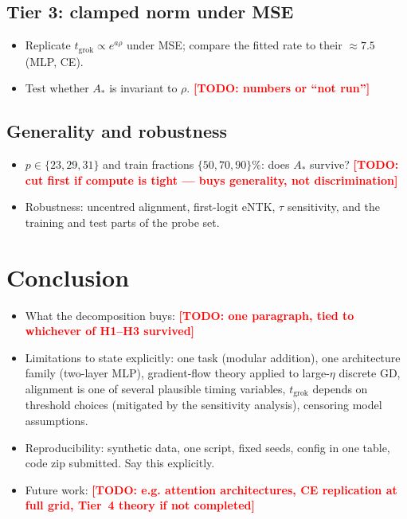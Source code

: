 \documentclass[a4paper,11pt]{article} %
\newcommand{\TODO}[1]{\textcolor{red}{\textbf{[TODO: #1]}}}
\newcommand{\tgrok}{t_{\mathrm{grok}}}
\newcommand{\Astar}{A_{*}}
\begin{document}
\subsection{Tier 3: clamped norm under MSE}
\begin{itemize}
	\item Replicate $\tgrok\propto e^{a\rho}$ \citep{truong2026norm} under MSE;
		compare the fitted rate to their $\approx7.5$ (MLP, CE).
	\item Test whether $\Astar$ is invariant to $\rho$. \TODO{numbers or
		``not run''}
\end{itemize}

\subsection{Generality and robustness}
\begin{itemize}
	\item $p\in\{23,29,31\}$ and train fractions $\{50,70,90\}\%$: does $\Astar$
		survive? \TODO{cut first if compute is tight --- buys generality, not
		discrimination}
	\item Robustness: uncentred alignment, first-logit eNTK, $\tau$ sensitivity,
		and the training and test parts of the probe set.
\end{itemize}

\section{Conclusion}

\begin{itemize}
	\item What the decomposition buys: \TODO{one paragraph, tied to whichever of
		H1--H3 survived}
	\item Limitations to state explicitly: one task (modular addition), one
		architecture family (two-layer MLP), gradient-flow theory applied to
		large-$\eta$ discrete GD, alignment is one of several plausible timing
		variables, $\tgrok$ depends on threshold choices (mitigated by the
		sensitivity analysis), censoring model assumptions.
	\item Reproducibility: synthetic data, one script, fixed seeds, config in one
		table, code zip submitted. Say this explicitly.
	\item Future work: \TODO{e.g. attention architectures, CE replication at full
		grid, Tier~4 theory if not completed}
\end{itemize}
\end{document}
